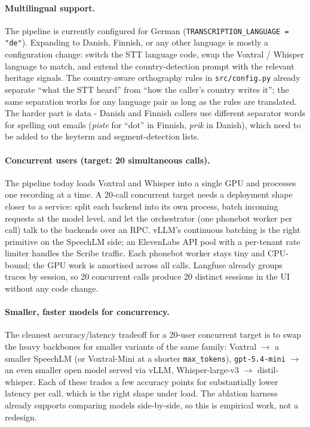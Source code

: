 \documentclass[11pt,a4paper]{article}
\begin{document}
\paragraph{Multilingual support.}
The pipeline is currently configured for German
(\verb|TRANSCRIPTION_LANGUAGE = "de"|). Expanding to Danish,
Finnish, or any other language is mostly a configuration change:
switch the STT language code, swap the Voxtral / Whisper language
to match, and extend the country-detection prompt with the
relevant heritage signals. The country-aware orthography rules in
\verb|src/config.py| already separate ``what the STT heard'' from
``how the caller's country writes it''; the same separation works
for any language pair as long as the rules are translated. The
harder part is data - Danish and Finnish callers use different
separator words for spelling out emails (\textit{piste} for ``dot''
in Finnish, \textit{prik} in Danish), which need to be added to
the keyterm and segment-detection lists.

\paragraph{Concurrent users (target: 20 simultaneous calls).}
The pipeline today loads Voxtral and Whisper into a single GPU and
processes one recording at a time. A 20-call concurrent target
needs a deployment shape closer to a service: split each backend
into its own process, batch incoming requests at the model level,
and let the orchestrator (one phonebot worker per call) talk to
the backends over an RPC. vLLM's continuous batching is the right
primitive on the SpeechLM side; an ElevenLabs API pool with a
per-tenant rate limiter handles the Scribe traffic. Each phonebot
worker stays tiny and CPU-bound; the GPU work is amortised across
all calls. Langfuse already groups traces by session, so 20
concurrent calls produce 20 distinct sessions in the UI without
any code change.

\paragraph{Smaller, faster models for concurrency.}
The cleanest accuracy/latency tradeoff for a 20-user concurrent
target is to swap the heavy backbones for smaller variants of the
same family: Voxtral $\to$ a smaller SpeechLM (or Voxtral-Mini at
a shorter \verb|max_tokens|), \verb|gpt-5.4-mini| $\to$ an even
smaller open model served via vLLM, Whisper-large-v3 $\to$
distil-whisper. Each of these trades a few accuracy points for
substantially lower latency per call, which is the right shape
under load. The ablation harness already supports comparing models
side-by-side, so this is empirical work, not a redesign.
\end{document}
